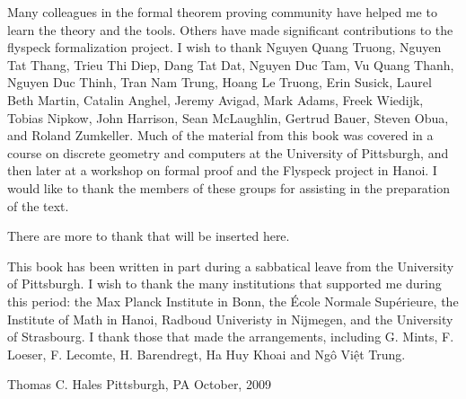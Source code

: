 Many colleagues in the formal theorem proving community have helped me to learn the theory and the tools.  Others have made significant contributions to the flyspeck formalization project.  I wish to thank 
Nguyen Quang Truong, %
Nguyen Tat Thang, %
Trieu Thi Diep, Dang Tat Dat, Nguyen Duc Tam, Vu Quang Thanh, Nguyen Duc Thinh, Tran Nam Trung, Hoang Le Truong,
Erin Susick, Laurel Beth Martin, Catalin Anghel,
Jeremy Avigad, Mark Adams, Freek Wiedijk,  Tobias Nipkow, John Harrison, Sean McLaughlin, Gertrud Bauer, Steven Obua, and Roland Zumkeller.   Much of the material from this book was covered in a course on discrete geometry and computers at the University of Pittsburgh, and then later at a workshop on formal proof and the Flyspeck project in Hanoi.  I would like to thank the members of these groups for assisting in the preparation of the text.

\begin{note}%
There are more to thank that will be inserted here.
\end{note}

This book has been written in part during a sabbatical leave from the University of Pittsburgh.  I wish to thank the many institutions that supported
me during this period: the Max Planck Institute in Bonn, the \'Ecole Normale Sup\'erieure,  the Institute of Math
in Hanoi, Radboud Univeristy in Nijmegen, and the University of Strasbourg.
I thank those that made the arrangements, including G. Mints, F. Loeser, F. Lecomte, H. Barendregt, Ha Huy Khoai and Ng\^o Vi\d{\^e}t Trung.


\bigskip
\hbox{}



\bigskip
\hbox{}

{
\parindent=0pt
\obeylines

Thomas C. Hales
Pittsburgh, PA
October, 2009

}







